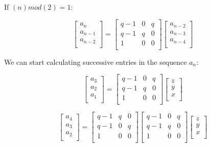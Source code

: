\documentclass[paper.tex]{subfiles}
\begin{document}
If $(n)mod(2) = 1$:

\[ 
\left[ \begin{array}{ccc}
a_{n} \\
a_{n-1} \\
a_{n-2} \\
\end{array} \right] 
=
\left[ \begin{array}{ccc}
q-1 & 0 & q \\
q-1 & q & 0 \\
1 & 0 & 0 \\
\end{array} \right]
\left[ \begin{array}{ccc}
a_{n-2} \\
a_{n-3} \\
a_{n-4} \\
\end{array} \right] 
\] 


We can start calculating successive entries in the sequence {$a_{n}$}:

\[ 
\left[ \begin{array}{ccc}
a_{3} \\
a_{2} \\
a_{1} \\
\end{array} \right] 
=
\left[ \begin{array}{ccc}
q-1 & 0 & q \\
q-1 & q & 0 \\
1 & 0 & 0 \\
\end{array} \right]
\left[ \begin{array}{ccc}
z \\
y \\
x \\
\end{array} \right] 
\] 

\[ 
\left[ \begin{array}{ccc}
a_{4} \\
a_{3} \\
a_{2} \\
\end{array} \right] 
=
\left[ \begin{array}{ccc}
q-1 & q & 0 \\
q-1 & 0 & q \\
1 & 0 & 0 \\
\end{array} \right]
\left[ \begin{array}{ccc}
q-1 & 0 & q \\
q-1 & q & 0 \\
1 & 0 & 0 \\
\end{array} \right]
\left[ \begin{array}{ccc}
z \\
y \\
x \\
\end{array} \right] 
\] 
\end{document}
